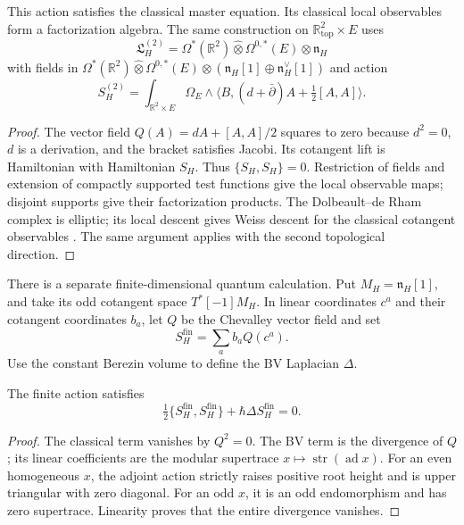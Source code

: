\begin{proposition}
This action satisfies the classical master equation. Its classical
local observables form a factorization algebra. The same construction
on \(\mathbb R^2_{\mathrm{top}}\times E\) uses
\[
 \mathfrak L_H^{(2)}=\Omega^*(\mathbb R^2)\widehat\otimes
                   \Omega^{0,*}(E)\otimes\mathfrak n_H
\]
with fields in
$\Omega^*(\mathbb R^2)\widehat\otimes\Omega^{0,*}(E)\otimes
(\mathfrak n_H[1]\oplus\mathfrak n_H^\vee[1])$
and action
\[
 S_H^{(2)}=\int_{\mathbb R^2\times E}\Omega_E\wedge
       \langle B,(d+\bar\partial)A+\tfrac12[A,A]\rangle.
\]
\end{proposition}
\begin{proof}
The vector field \(Q(A)=dA+[A,A]/2\) squares to zero because
\(d^2=0\), \(d\) is a derivation, and the bracket satisfies
Jacobi. Its cotangent lift is Hamiltonian with Hamiltonian \(S_H\).
Thus \(\{S_H,S_H\}=0\). Restriction of fields and extension of
compactly supported test functions give the local observable maps;
disjoint supports give their factorization products. The
Dolbeault--de Rham complex is elliptic; its local descent gives
Weiss descent for the classical cotangent observables
\cite{CG1,CG2}. The same argument applies with the second
topological direction.
\end{proof}

There is a separate finite-dimensional quantum calculation. Put
\(M_H=\mathfrak n_H[1]\), and take its odd cotangent space
\(T^*[-1]M_H\). In linear coordinates \(c^a\) and their
cotangent coordinates \(b_a\), let \(Q\) be the Chevalley
vector field and set
\[
 S_H^{\mathrm{fin}}=\sum_a b_aQ(c^a).
\]
Use the constant Berezin volume to define the BV Laplacian \(\Delta\).

\begin{proposition}
The finite action satisfies
\[
 \tfrac12\{S_H^{\mathrm{fin}},S_H^{\mathrm{fin}}\}
       +\hbar\Delta S_H^{\mathrm{fin}}=0.
\]
\end{proposition}
\begin{proof}
The classical term vanishes by \(Q^2=0\). The BV term is the
divergence of \(Q\); its linear coefficients are the modular
supertrace \(x\mapsto\operatorname{str}(\operatorname{ad}x)\).
For an even homogeneous \(x\), the adjoint action strictly raises
positive root height and is upper triangular with zero diagonal.
For an odd \(x\), it is an odd endomorphism and has zero
supertrace. Linearity proves that the entire divergence vanishes.
\end{proof}

